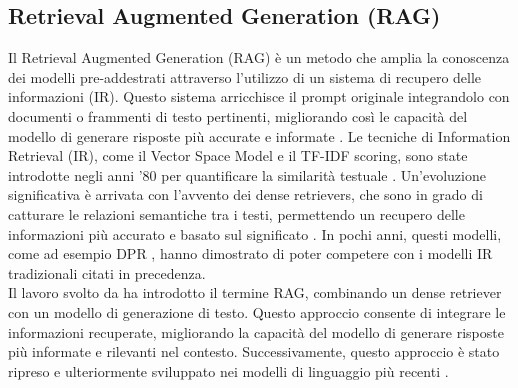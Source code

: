 \subsection{Retrieval Augmented Generation (RAG)}
Il Retrieval Augmented Generation (RAG) è un metodo che amplia la conoscenza dei modelli pre-addestrati attraverso l'utilizzo di un sistema di recupero delle informazioni (IR). Questo sistema arricchisce il prompt originale integrandolo con documenti o frammenti di testo pertinenti, migliorando così le capacità del modello di generare risposte più accurate e informate \cite{cuconasu2024power}.
Le tecniche di Information Retrieval (IR), come il Vector Space Model e il TF-IDF scoring, sono state introdotte negli anni '80 per quantificare la similarità testuale \cite{salton1983introduction}. Un'evoluzione significativa è arrivata con l'avvento dei dense retrievers, che sono in grado di catturare le relazioni semantiche tra i testi, permettendo un recupero delle informazioni più accurato e basato sul significato \cite{cuconasu2024power}. In pochi anni, questi modelli, come ad esempio DPR \cite{karpukhin2020dense}, hanno dimostrato di poter competere con i modelli IR tradizionali citati in precedenza.\\
Il lavoro svolto da \cite{lewis2020retrieval} ha introdotto il termine RAG, combinando un dense retriever con un modello di generazione di testo. Questo approccio consente di integrare le informazioni recuperate, migliorando la capacità del modello di generare risposte più informate e rilevanti nel contesto. Successivamente, questo approccio è stato ripreso e ulteriormente sviluppato nei modelli di linguaggio più recenti \cite{mialon2023augmented}.


